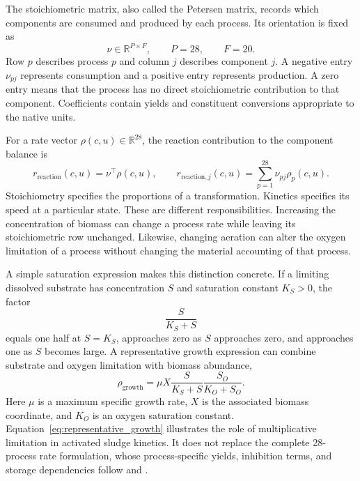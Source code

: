 The stoichiometric matrix, also called the Petersen matrix, records which components are consumed and produced by each process. Its orientation is fixed as
\begin{equation}
\nu\in\mathbb{R}^{P\times F},\qquad P=28,\qquad F=20.
\label{eq:petersen_orientation}
\end{equation}
Row $p$ describes process $p$ and column $j$ describes component $j$. A negative entry $\nu_{pj}$ represents consumption and a positive entry represents production. A zero entry means that the process has no direct stoichiometric contribution to that component. Coefficients contain yields and constituent conversions appropriate to the native units.

For a rate vector $\rho(c,u)\in\mathbb{R}^{28}$, the reaction contribution to the component balance is
\begin{equation}
r_{\mathrm{reaction}}(c,u)=\nu^\top\rho(c,u),\qquad
r_{\mathrm{reaction},j}(c,u)=\sum_{p=1}^{28}\nu_{pj}\rho_p(c,u).
\label{eq:reaction_contribution}
\end{equation}
Stoichiometry specifies the proportions of a transformation. Kinetics specifies its speed at a particular state. These are different responsibilities. Increasing the concentration of biomass can change a process rate while leaving its stoichiometric row unchanged. Likewise, changing aeration can alter the oxygen limitation of a process without changing the material accounting of that process.

A simple saturation expression makes this distinction concrete. If a limiting dissolved substrate has concentration $S$ and saturation constant $K_S>0$, the factor
\begin{equation}
\frac{S}{K_S+S}
\label{eq:saturation_example}
\end{equation}
equals one half at $S=K_S$, approaches zero as $S$ approaches zero, and approaches one as $S$ becomes large. A representative growth expression can combine substrate and oxygen limitation with biomass abundance,
\begin{equation}
\rho_{\mathrm{growth}}=
\mu X\frac{S}{K_S+S}\frac{S_O}{K_O+S_O}.
\label{eq:representative_growth}
\end{equation}
Here $\mu$ is a maximum specific growth rate, $X$ is the associated biomass coordinate, and $K_O$ is an oxygen saturation constant. Equation~\eqref{eq:representative_growth} illustrates the role of multiplicative limitation in activated sludge kinetics. It does not replace the complete 28-process rate formulation, whose process-specific yields, inhibition terms, and storage dependencies follow \citet{Henze2006} and \citet{Guerrero2011}.

